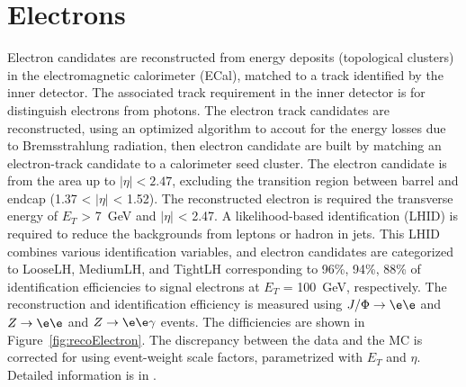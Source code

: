 \section{Electrons}
Electron candidates are reconstructed from energy deposits (topological clusters) in the electromagnetic calorimeter (ECal), matched to a track identified by the inner detector. The associated track requirement in the inner detector is for distinguish electrons from photons. The electron track candidates are reconstructed, using an optimized algorithm to accout for the energy losses due to Bremsstrahlung radiation, then electron candidate are built by matching an electron-track candidate to a calorimeter seed cluster. The electron candidate is from the area up to $|\eta|<2.47$, excluding the transition region between barrel and endcap (1.37 < $|\eta|$ < 1.52).
The reconstructed electron is required the transverse energy of $E_T$ > 7~GeV and $|\eta|$ < 2.47. A likelihood-based identification (LHID) is required to reduce the backgrounds from leptons or hadron in jets. This LHID combines various identification variables, and electron candidates are categorized to LooseLH, MediumLH, and TightLH corresponding to 96\%, 94\%, 88\% of identification efficiencies to signal electrons at $E_T$ = 100~GeV, respectively.
The reconstruction and identification efficiency is measured using  $J/\Phi \rightarrow \e\e$ and $Z\rightarrow \e\e$ and $Z\rightarrow \e\e\gamma$ events. The difficiencies are shown in Figure~\ref{fig:recoElectron}. The discrepancy between the data and the MC is corrected for using event-weight scale factors, parametrized with $E_T$ and $\eta$. Detailed information is in \cite{PERF-2017-01}.


